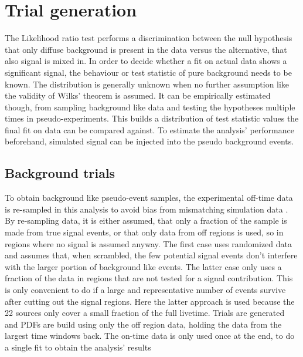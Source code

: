 \section{Trial generation}
The Likelihood ratio test performs a discrimination between the null hypothesis that only diffuse background is present in the data versus the alternative, that also signal is mixed in.
In order to decide whether a fit on actual data shows a significant signal, the behaviour or test statistic of pure background needs to be known.
The distribution is generally unknown when no further assumption like the validity of Wilks' theorem is assumed.
It can be empirically estimated though, from sampling background like data and testing the hypotheses multiple times in pseudo-experiments.
This builds a distribution of test statistic values the final fit on data can be compared against.
To estimate the analysis' performance beforehand, simulated signal can be injected into the pseudo background events.

\subsection*{Background trials}
To obtain background like pseudo-event samples, the experimental off-time data is re-sampled in this analysis to avoid bias from mismatching simulation data .
By re-sampling data, it is either assumed, that only a fraction of the sample is made from true signal events, or that only data from off regions is used, so in regions where no signal is assumed anyway.
The first case uses randomized data and assumes that, when scrambled, the few potential signal events don't interfere with the larger portion of background like events.
The latter case only uses a fraction of the data in regions that are not tested for a signal contribution.
This is only convenient to do if a large and representative number of events survive after cutting out the signal regions.
Here the latter approach is used because the 22 sources only cover a small fraction of the full livetime.
Trials are generated and PDFs are build using only the off region data, holding the data from the largest time windows back.
The on-time data is only used once at the end, to do a single fit to obtain the analysis' results


